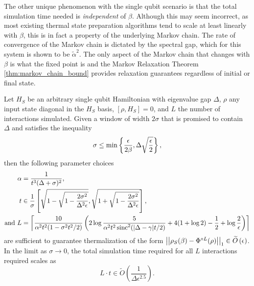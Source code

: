 The other unique phenomenon with the single qubit scenario is that the total simulation time needed is \emph{independent} of $\beta$. Although this may seem incorrect, as most existing thermal state preparation algorithms tend to scale at least linearly with $\beta$, this is in fact a property of the underlying Markov chain. The rate of convergence of the Markov chain is dictated by the spectral gap, which for this system is shown to be $\widetilde{\alpha}^2$. The only aspect of the Markov chain that changes with $\beta$ is what the fixed point is and the Markov Relaxation Theorem \ref{thm:markov_chain_bound} provides relaxation guarantees regardless of initial or final state. 




\begin{theorem} \label{thm:single_qubit}
    Let $H_S$ be an arbitrary single qubit Hamiltonian with eigenvalue gap $\Delta$, $\rho$ any input state diagonal in the $H_S$ basis, $[\rho, H_S] = 0$, and $L$ the number of interactions simulated. Given a window of width $2 \sigma$ that is promised to contain $\Delta$ and satisfies the inequality
    \begin{align}
        \sigma \le \min \left\{ \frac{\epsilon}{2\beta}, \Delta \sqrt{\frac{\epsilon}{2}} \right\},
    \end{align}
    then the following parameter choices 
    \begin{align}
        \alpha &= \frac{1}{t^3(\Delta + \sigma)^2}, \nonumber \\
        t &\in \frac{1}{\sigma}\left[\sqrt{1 - \sqrt{1 - \frac{2 \sigma^2}{\Delta^2 \epsilon}} }, \sqrt{1 + \sqrt{1 - \frac{2 \sigma^2}{\Delta^2 \epsilon}} } \right], \nonumber\\
        \text{and } L &= \left\lceil\frac{10}{\alpha^2 t^2 (1 - \sigma^2 t^2 / 2)} \left( 2 \log \frac{5}{\alpha^2 t^2 \operatorname{sinc}^2(|\Delta - \gamma|t/2)} + 4( 1 + \log 2) - \frac{1}{2} + \log \frac{2}{\epsilon} \right)\right\rceil
    \end{align}
    are sufficient to guarantee thermalization of the form $\left| \left| \rho_S(\beta) - \Phi^{\circ L}(\rho) \right| \right|_1 \in \widetilde{O} \left( \epsilon \right)$. In the limit as $\sigma \to 0$, the total simulation time required for all $L$ interactions required scales as
    \begin{equation}
        L \cdot t \in \widetilde{O} \left( \frac{1}{\Delta \epsilon^{2.5}}\right).
    \end{equation}
\end{theorem}
